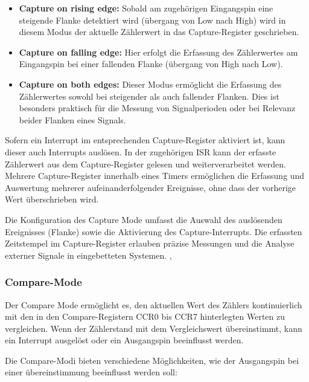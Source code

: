 \begin{itemize}
	\item \textbf{Capture on rising edge:} Sobald am zugeh\"origen Eingangspin eine steigende Flanke detektiert wird (\"ubergang von Low nach High) wird in diesem Modus der aktuelle Z\"ahlerwert in das Capture-Register geschrieben.

	\item \textbf{Capture on falling edge:} Hier erfolgt die Erfassung des Z\"ahlerwertes am Eingangspin bei einer fallenden Flanke (\"ubergang von High nach Low).

	\item \textbf{Capture on both edges:} Dieser Modus erm\"oglicht die Erfassung des Z\"ahlerwertes sowohl bei steigender als auch fallender Flanken. Dies ist besonders praktisch f\"ur die Messung von Signalperioden oder bei Relevanz beider Flanken eines Signals.
\end{itemize}

Sofern ein Interrupt im entsprechenden Capture-Register aktiviert ist, kann dieser auch Interrupts ausl\"osen. In der zugeh\"origen ISR kann der erfasste Z\"ahlerwert aus dem Capture-Register gelesen und weiterverarbeitet werden. Mehrere Capture-Register innerhalb eines Timers erm\"oglichen die Erfassung und Auswertung mehrerer aufeinanderfolgender Ereignisse, ohne dass der vorherige Wert \"uberschrieben wird.

Die Konfiguration des Capture Mode umfasst die Auswahl des ausl\"osenden Ereignisses (Flanke) sowie \ggf die Aktivierung des Capture-Interrupts. Die erfassten Zeitstempel im Capture-Register erlauben pr\"azise Messungen und die Analyse externer Signale in eingebetteten Systemen. , 

\subsubsection{Compare-Mode}
\label{Timer_CompareMode}

Der Compare Mode erm\"oglicht es, den aktuellen Wert des Z\"ahlers kontinuierlich mit den in den Compare-Registern CCR0 bis CCR7 hinterlegten Werten zu vergleichen. Wenn der Z\"ahlerstand mit dem Vergleichswert \"ubereinstimmt, kann \zB ein Interrupt ausgel\"ost oder ein Ausgangspin beeinflusst werden.

Die Compare-Modi bieten verschiedene M\"oglichkeiten, wie der Ausgangspin bei einer \"ubereinstimmung beeinflusst werden soll:

